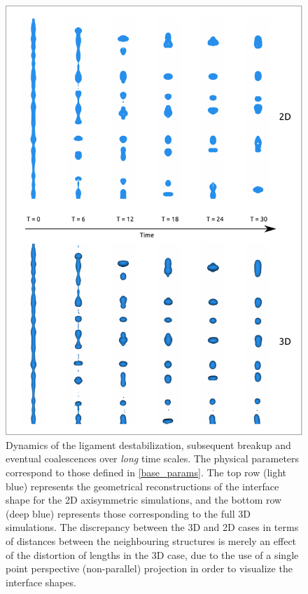 \begin{figure}
\centering
\includegraphics{plots/ligament_breakup/3d_vs_2d_long.pdf}
	\caption{Dynamics of the ligament destabilization, subsequent breakup 
	and eventual coalescences over \textit{long} time scales. 
	The physical parameters correspond to those defined in \eqref{base_params}.
	The top row (light blue) represents the geometrical reconstructions of 
	the interface shape for the 2D axisymmetric simulations, and the bottom 
	row (deep blue) represents those corresponding to the full 3D simulations.
	The discrepancy between the 3D and 2D cases in terms of distances between
	the neighbouring structures is merely an effect of the distortion of lengths
	in the 3D case, due to the use of a single point perspective (non-parallel) 
	projection in order to visualize the interface shapes. 
	}
\label{2d_3d_long}
\end{figure}


